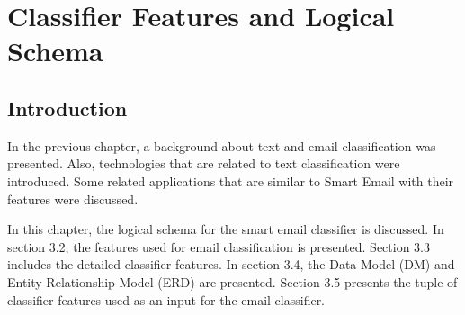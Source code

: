 
\chapter{Classifier Features and Logical Schema} %

\label{Chapter3} %



\section{Introduction}
In the previous chapter, a background about text and email classification was presented. Also, technologies that are related to text classification were introduced. Some related applications that are similar to Smart Email with their features were discussed.

In this chapter, the logical schema for the smart email classifier is discussed. In section 3.2, the features used for email classification is presented. Section 3.3 includes the detailed classifier features. In section 3.4, the Data Model (DM) and Entity Relationship Model (ERD) are presented. Section 3.5 presents the tuple of classifier features used as an input for the email classifier.
\newpage
